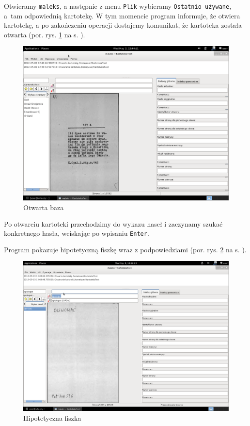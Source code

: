 \documentclass[12pt,oneside,notitlepage,titleauthor]{mwart}%
\begin{document}
Otwieramy \texttt{maleks}, a następnie z menu \texttt{Plik} wybieramy \texttt{Ostatnio używane}, a~tam odpowiednią kartotekę. W tym momencie program informuje, że otwiera kartotekę, a po zakończeniu operacji dostajemy komunikat, że kartoteka została otwarta (por. rys. \ref{02_otwartabaza} na s. \pageref{02_otwartabaza}).

\begin{figure}[h]
\includegraphics[scale=0.3]{02_otwartabaza.png}
\caption{Otwarta baza}
\label{02_otwartabaza}
\end{figure}

Po otwarciu kartoteki przechodzimy do wykazu haseł i zaczynamy szukać konkretnego hasła, wciskając po wpisaniu \texttt{Enter}.


Program pokazuje hipotetyczną fiszkę wraz z podpowiedziami (por. rys. \ref{01episkopat} na s. \pageref{01episkopat}). 

\begin{figure}[h]
\includegraphics[scale=0.3]{01episkopat.png} 
\caption{Hipotetyczna fiszka}
\label{01episkopat}
\end{figure}
\end{document}
